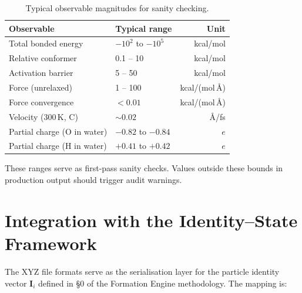 \documentclass[12pt, a4paper, oneside]{article}
\begin{document}
\begin{table}[htbp]
  \centering
  \caption{Typical observable magnitudes for sanity checking.}
  \label{tab:ranges}
  \begin{tabular}{llr}
    \toprule
    Observable & Typical range & Unit \\
    \midrule
    Total bonded energy     & $-10^2$ to $-10^5$         & kcal/mol \\
    Relative conformer      & 0.1 -- 10                  & kcal/mol \\
    Activation barrier      & 5 -- 50                    & kcal/mol \\
    Force (unrelaxed)       & 1 -- 100                   & kcal/(mol\,\AA) \\
    Force convergence       & $< 0.01$                   & kcal/(mol\,\AA) \\
    Velocity (300\,K, C)    & $\sim 0.02$                & \AA/fs \\
    Partial charge (O in water)  & $-0.82$ to $-0.84$    & $e$ \\
    Partial charge (H in water)  & $+0.41$ to $+0.42$    & $e$ \\
    \bottomrule
  \end{tabular}
\end{table}

These ranges serve as first-pass sanity checks.  Values outside
these bounds in production output should trigger audit warnings.

\section{Integration with the Identity--State Framework}
\label{sec:s0}

The XYZ file formats serve as the serialisation layer for the
particle identity vector $\mathbf{I}_i$ defined in §0 of the
Formation Engine methodology.  The mapping is:
\end{document}
